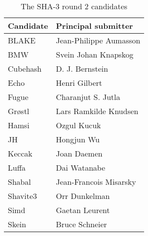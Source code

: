 \begin{table}
  \centering
  \caption{The \ac{SHA}-3 round 2 candidates}
  \begin{tabular}{ | l | l | }
    \hline
    \textbf{Candidate} & \textbf{Principal submitter}  \\ \hline
     BLAKE       & Jean-Philippe Aumasson   \\ \hline
     \ac{BMW}    & Svein Johan Knapskog     \\ \hline
     Cubehash    & D. J. Bernstein          \\ \hline
     Echo        & Henri Gilbert            \\ \hline
     Fugue       & Charanjut S. Jutla       \\ \hline
     Grøstl      & Lars Ramkilde Knudsen    \\ \hline
     Hamsi       & Ozgul Kucuk              \\ \hline
     JH          & Hongjun  Wu              \\ \hline
     Keccak      & Joan Daemen              \\ \hline
     Luffa       & Dai Watanabe             \\ \hline
     Shabal      & Jean-Francois Misarsky   \\ \hline
     Shavite3    & Orr Dunkelman            \\ \hline
     Simd        & Gaetan Leurent           \\ \hline
     Skein       & Bruce Schneier           \\ \hline
  \end{tabular}
  \label{tbl:sha3:candidates}
\end{table}
